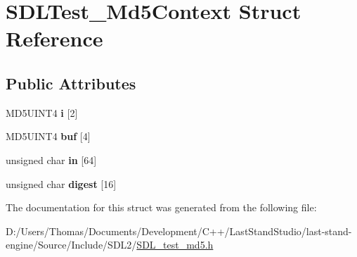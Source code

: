 \hypertarget{structSDLTest__Md5Context}{}\section{S\+D\+L\+Test\+\_\+\+Md5\+Context Struct Reference}
\label{structSDLTest__Md5Context}
\subsection*{Public Attributes}
\begin{DoxyCompactItemize}
\item 
\hypertarget{structSDLTest__Md5Context_a95b3d5fd74fd1b7a27bf96f3bb32beb4}{}M\+D5\+U\+I\+N\+T4 {\bfseries i} \mbox{[}2\mbox{]}\label{structSDLTest__Md5Context_a95b3d5fd74fd1b7a27bf96f3bb32beb4}

\item 
\hypertarget{structSDLTest__Md5Context_a061f0cead7ec49ac4c5baf0bbd9c13a7}{}M\+D5\+U\+I\+N\+T4 {\bfseries buf} \mbox{[}4\mbox{]}\label{structSDLTest__Md5Context_a061f0cead7ec49ac4c5baf0bbd9c13a7}

\item 
\hypertarget{structSDLTest__Md5Context_a337638ef799dc0ad9397ea9b175ea388}{}unsigned char {\bfseries in} \mbox{[}64\mbox{]}\label{structSDLTest__Md5Context_a337638ef799dc0ad9397ea9b175ea388}

\item 
\hypertarget{structSDLTest__Md5Context_ab29079997a9f35e5d52c2aac3ad28f90}{}unsigned char {\bfseries digest} \mbox{[}16\mbox{]}\label{structSDLTest__Md5Context_ab29079997a9f35e5d52c2aac3ad28f90}

\end{DoxyCompactItemize}


The documentation for this struct was generated from the following file\+:\begin{DoxyCompactItemize}
\item 
D\+:/\+Users/\+Thomas/\+Documents/\+Development/\+C++/\+Last\+Stand\+Studio/last-\/stand-\/engine/\+Source/\+Include/\+S\+D\+L2/\hyperlink{SDL__test__md5_8h}{S\+D\+L\+\_\+test\+\_\+md5.\+h}\end{DoxyCompactItemize}
